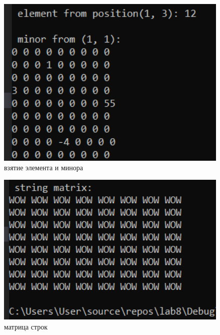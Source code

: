 ﻿\documentclass[a4paper, 12pt]{extarticle}
\begin{document}
\begin{figure}[H]
    \centering
    \includegraphics[width=400pt]{Test1.png}
    \caption{взятие элемента и минора}
    \label{fig:my_label}
\end{figure}

\begin{figure}[H]
    \centering
    \includegraphics[width=400pt]{Test2.png}
    \caption{матрица строк}
    \label{fig:my_label}
\end{figure}
\end{document}

